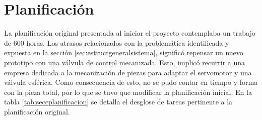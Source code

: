 \section{Planificación}
\label{sec:planificacion}
La planificación original presentada al iniciar el proyecto contemplaba un trabajo de 600 horas. Los atrasos relacionados con la problemática identificada y expuesta en la sección \ref{sec:estructgeneralsistema}, significó repensar un nuevo prototipo con una válvula de control  mecanizada. Esto, implicó recurrir a una empresa dedicada a la mecanización de piezas para adaptar el servomotor y una válvula esférica. Como consecuencia de esto, no se pudo contar en tiempo y forma con la pieza total, por lo que se tuvo que modificar la planificación inicial. 
En la tabla \ref{tab:seccplanificacion} se detalla el desglose de tareas pertinente a la planificación original. 
